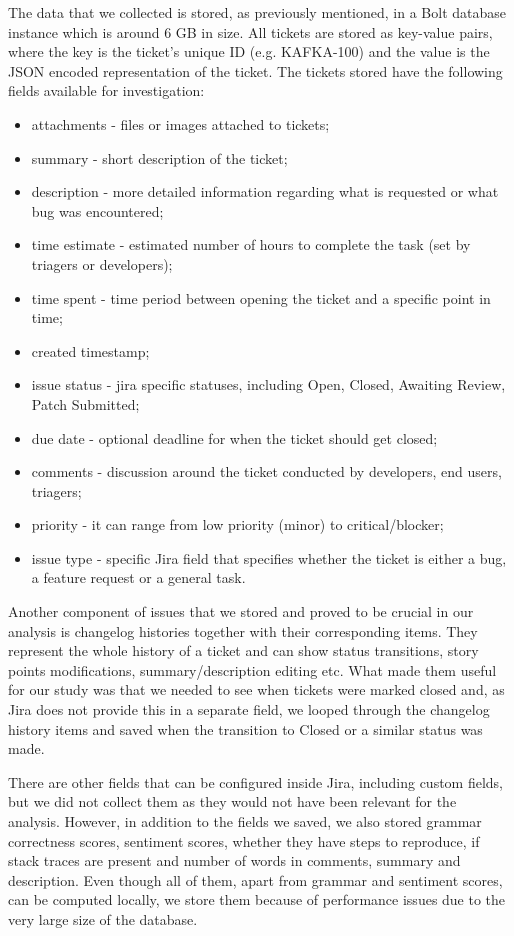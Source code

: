\documentclass{mpaper}
\begin{document}
The data that we collected is stored, as previously mentioned, in a Bolt database instance which is around 6 GB in size. 
All tickets are stored as key-value pairs, where the key is the ticket's unique ID (e.g. KAFKA-100) and the value is the 
JSON encoded representation of the ticket. The tickets stored have the following fields available for investigation:
\begin{itemize}
  \item attachments - files or images attached to tickets;
  \item summary - short description of the ticket;
  \item description - more detailed information regarding what is requested or what bug was encountered;
  \item time estimate - estimated number of hours to complete the task (set by triagers or developers);
  \item time spent - time period between opening the ticket and a specific point in time;
  \item created timestamp;
  \item issue status - jira specific statuses, including Open, Closed, Awaiting Review, Patch Submitted;
  \item due date - optional deadline for when the ticket should get closed;
  \item comments - discussion around the ticket conducted by developers, end users, triagers;
  \item priority - it can range from low priority (minor) to critical/blocker;
  \item issue type - specific Jira field that specifies whether the ticket is either a bug, a feature request or a general task.
\end{itemize}

Another component of issues that we stored and proved to be crucial in our analysis is changelog histories together with their 
corresponding items. They represent the whole history of a ticket and can show status transitions, story points modifications, 
summary/description editing etc. What made them useful for our study was that we needed to see when tickets were marked closed and, 
as Jira does not provide this in a separate field, we looped through the changelog history items and saved when the transition to 
Closed or a similar status was made. 

There are other fields that can be configured inside Jira, including custom fields, but we did not collect them as they would not 
have been relevant for the analysis. However, in addition to the fields we saved, we also stored grammar correctness scores, 
sentiment scores, whether they have steps to reproduce, if stack traces are present and number of words in comments, summary and description. 
Even though all of them, apart from grammar and sentiment scores, can be computed locally, we store them because of performance issues
due to the very large size of the database. 
\end{document}
